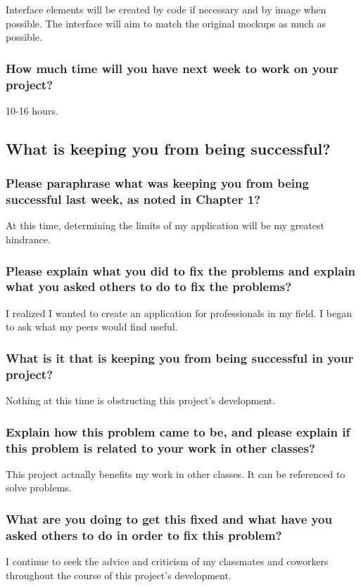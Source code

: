 \documentclass[letterpaper]{article}            %
\begin{document}
Interface elements will be created by code if necessary and by image when possible. The interface will aim to match the original mockups as much as possible.

\subsubsection{How much time will you have next week to work on your project?}

10-16 hours.


\subsection{What is keeping you from being successful?}

\subsubsection{Please paraphrase what was keeping you from being successful last week, as noted in Chapter 1?}

At this time, determining the limits of my application will be my greatest hindrance.

\subsubsection{Please explain what you did to fix the problems and explain what you asked others to do to fix the problems?}

I realized I wanted to create an application for professionals in my field. I began to ask what my peers would find useful.

\subsubsection{What is it that is keeping you from being successful in your project?}

Nothing at this time is obstructing this project's development.

\subsubsection{Explain how this problem came to be, and please explain if this problem is related to your work in other classes?}

This project actually benefits my work in other classes. It can be referenced to solve problems.

\subsubsection{What are you doing to get this fixed and what have you asked others to do
in order to fix this problem?}

I continue to seek the advice and criticism of my classmates and coworkers throughout the course of this project's development.
\end{document}
